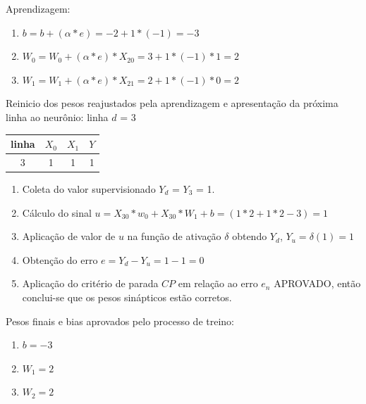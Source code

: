 \documentclass[	12pt, Times, openright, twoside, a4paper, english, brazil]{abntex2}
\begin{document}
            	
            	Aprendizagem:
            	\begin{enumerate}
            		\item $b=b+(\alpha*e) = -2 + 1*(-1) = -3 $  					
            		\item $W_0=W_0 + (\alpha*e)*X_{20} = 3 + 1*(-1)*1 = 2$ 
            		\item $W_1=W_1 + (\alpha*e)*X_{21}= 2 + 1*(-1)*0 = 2$
            	\end{enumerate}	
            	
            	Reinicio dos pesos reajustados pela aprendizagem e apresentação da próxima linha ao neurônio:
    				linha $d$ = 3\\
    				\begin{table}[!ht]
                    \centering
    				\begin{tabular}{|c|c|c|c|}
    					\hline  \textbf{linha} & \textbf{$X_0$} & \textbf{$X_1$} &  \textbf{$Y$}\\
  				 	    \hline 3 & 1 & 1 & 1\\
    				\end{tabular}
    				\end{table}
            	
            	\begin{enumerate}
            	    \item Coleta do valor supervisionado $Y_d$ = $Y_3$ = 1.
            		\item Cálculo do sinal $u = X_{30}*w_0 + X_{30}*W_1 +b = (1*2 + 1*2 -3) = 1$
            		\item Aplicação de valor de $u$ na função de ativação $\delta$ obtendo $Y_d$, $Y_u = \delta(1) = 1$
            		\item Obtenção do erro $e = Y_d-Y_u = 1 - 1 = 0$
            		\item Aplicação do critério de parada $CP$ em relação ao erro $e_n$ APROVADO, então conclui-se que os pesos sinápticos estão corretos.
            	\end{enumerate}
                
            	Pesos finais e bias aprovados pelo processo de treino:
            	\begin{enumerate}
            		\item $b=  -3$  					
            		\item $W_1= 2$ 
            		\item $W_2= 2$
            	\end{enumerate}	
            	
\end{document}
